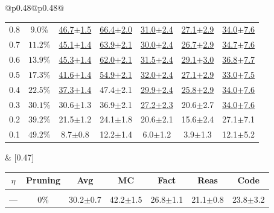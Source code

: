 \begin{table}[t]
\begin{tabular}{@{}p{}@{}p{}@{}}
{\begin{tabular}{c c c c c c c}
\rowcolor{white} 0.8 & $9.0\%$ & \underline{46.7{\scriptsize$\pm$1.5}} & \underline{66.4{\scriptsize$\pm$2.0}} & \underline{31.0{\scriptsize$\pm$2.4}} & \underline{27.1{\scriptsize$\pm$2.9}} & \underline{34.0{\scriptsize$\pm$7.6}} \\
\rowcolor{white} 0.7 & $11.2\%$ & \underline{45.1{\scriptsize$\pm$1.4}} & \underline{63.9{\scriptsize$\pm$2.1}} & \underline{30.0{\scriptsize$\pm$2.4}} & \underline{26.7{\scriptsize$\pm$2.9}} & \underline{34.7{\scriptsize$\pm$7.6}} \\
\rowcolor{white} 0.6 & $13.9\%$ & \underline{45.3{\scriptsize$\pm$1.4}} & \underline{62.0{\scriptsize$\pm$2.1}} & \underline{31.5{\scriptsize$\pm$2.4}} & \underline{29.1{\scriptsize$\pm$3.0}} & \underline{36.8{\scriptsize$\pm$7.7}} \\
\rowcolor{white} 0.5 & $17.3\%$ & \underline{41.6{\scriptsize$\pm$1.4}} & \underline{54.9{\scriptsize$\pm$2.1}} & \underline{32.0{\scriptsize$\pm$2.4}} & \underline{27.1{\scriptsize$\pm$2.9}} & \underline{33.0{\scriptsize$\pm$7.5}} \\
\rowcolor{white} 0.4 & $22.5\%$ & \underline{37.3{\scriptsize$\pm$1.4}} & 47.4{\scriptsize$\pm$2.1} & \underline{29.9{\scriptsize$\pm$2.4}} & \underline{25.8{\scriptsize$\pm$2.9}} & \underline{34.0{\scriptsize$\pm$7.6}} \\
\rowcolor{white} 0.3 & $30.1\%$ & 30.6{\scriptsize$\pm$1.3} & 36.9{\scriptsize$\pm$2.1} & \underline{27.2{\scriptsize$\pm$2.3}} & 20.6{\scriptsize$\pm$2.7} & \underline{34.0{\scriptsize$\pm$7.6}} \\
\rowcolor{white} 0.2 & $39.2\%$ & 21.5{\scriptsize$\pm$1.2} & 24.1{\scriptsize$\pm$1.8} & 20.6{\scriptsize$\pm$2.1} & 15.6{\scriptsize$\pm$2.4} & 27.1{\scriptsize$\pm$7.1} \\
\rowcolor{white} 0.1 & $49.2\%$ & 8.7{\scriptsize$\pm$0.8} & 12.2{\scriptsize$\pm$1.4} & 6.0{\scriptsize$\pm$1.2} & 3.9{\scriptsize$\pm$1.3} & 12.1{\scriptsize$\pm$5.2} \\
\bottomrule
\end{tabular}
} &
[0.47\textwidth]{
\begin{tabular}{c c c c c c c}
\toprule
\textbf{$\eta$} & \textbf{Pruning} & \textbf{Avg} & \textbf{MC} & \textbf{Fact} & \textbf{Reas} & \textbf{Code} \\
\midrule
\rowcolor{lightgray} \multicolumn{7}{c}{\rule{0pt}{2.2ex}\textbf{Dense Model}\rule[-0.8ex]{0pt}{0pt}} \\
\rowcolor{white} --- & 0\% & 30.2{\scriptsize$\pm$0.7} & 42.2{\scriptsize$\pm$1.5} & 26.8{\scriptsize$\pm$1.1} & 21.1{\scriptsize$\pm$0.8} & 23.8{\scriptsize$\pm$3.2} \\

\end{tabular}}
\end{tabular}
\end{table}
